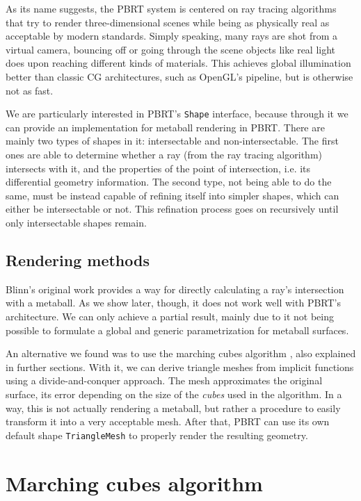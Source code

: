 \documentclass[conference]{acmsiggraph}
\begin{document}
As its name suggests, the PBRT system is centered on ray tracing algorithms that
try to render three-dimensional scenes while being as physically real as
acceptable by modern standards. Simply speaking, many rays are shot from a
virtual camera, bouncing off or going through the scene objects like real light
does upon reaching different kinds of materials. This achieves global
illumination better than classic CG architectures, such as OpenGL's pipeline, 
but is otherwise not as fast.

We are particularly interested in PBRT's \texttt{Shape} interface, because
through it we can provide an implementation for metaball rendering in PBRT.
There are mainly two types of shapes in it: intersectable and non-intersectable.
The first ones are able to determine whether a ray (from the ray tracing
algorithm) intersects with it, and the properties of the point of intersection,
i.e. its differential geometry information. The second type, not being able to
do the same, must be instead capable of refining itself into simpler shapes,
which can either be intersectable or not. This refination process goes on
recursively until only intersectable shapes remain.

\subsection{Rendering methods}

Blinn's original work  provides a way
for directly calculating a ray's intersection with a metaball. As we show
later, though, it does not work well with PBRT's architecture. We can only
achieve a partial result, mainly due to it not being possible to formulate a
global and generic parametrization for metaball surfaces.

An alternative we found was to use the marching cubes algorithm
\cite{Lorensen:1987:MCH:37402.37422}, also explained in further sections. With
it, we can derive triangle meshes from implicit functions using a
divide-and-conquer approach. The mesh approximates the original surface, its
error depending on the size of the \textit{cubes} used in the algorithm. In a
way, this is not actually rendering a metaball, but rather a procedure to
easily transform it into a very acceptable mesh. After that, PBRT can use its
own default shape \texttt{TriangleMesh} to properly render the resulting
geometry.

\section{Marching cubes algorithm}
\end{document}
